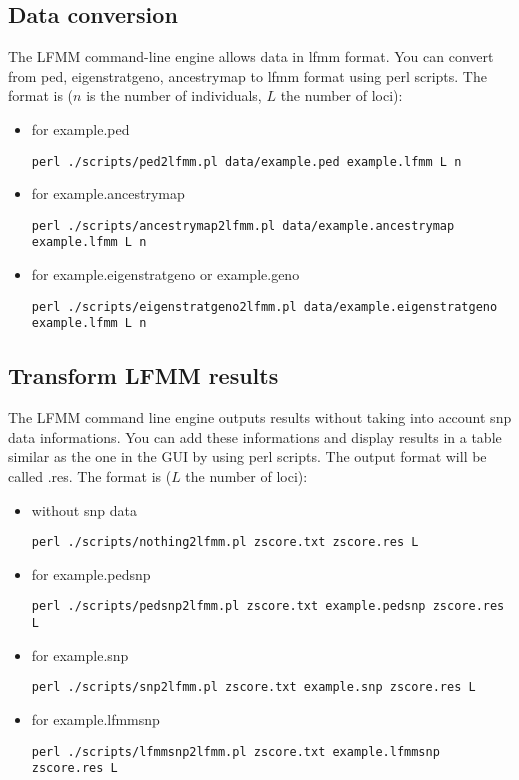 \documentclass[10pt,a4paper]{article}
\begin{document}
\subsection{Data conversion}

The LFMM command-line engine allows data in lfmm format. You can convert from ped, eigenstratgeno,
ancestrymap to lfmm format using perl scripts. The format is ($n$ is the number of individuals,
$L$ the number of loci):
\begin{itemize}
\item for example.ped
\begin{Verbatim}[frame=single]
perl ./scripts/ped2lfmm.pl data/example.ped example.lfmm L n
\end{Verbatim}
\item for example.ancestrymap
\begin{Verbatim}[frame=single]
perl ./scripts/ancestrymap2lfmm.pl data/example.ancestrymap example.lfmm L n
\end{Verbatim}
\item for example.eigenstratgeno or example.geno
\begin{Verbatim}[frame=single]
perl ./scripts/eigenstratgeno2lfmm.pl data/example.eigenstratgeno example.lfmm L n
\end{Verbatim}
\end{itemize}

\subsection{Transform LFMM results}

The LFMM command line engine outputs results without taking into account snp data informations.
You can add these informations and display results in a table similar as the one in the GUI
by using perl scripts. The output format will be called .res.
The format is ($L$ the number of loci):
\begin{itemize}
\item without snp data
\begin{Verbatim}[frame=single]
perl ./scripts/nothing2lfmm.pl zscore.txt zscore.res L
\end{Verbatim}
\item for example.pedsnp
\begin{Verbatim}[frame=single]
perl ./scripts/pedsnp2lfmm.pl zscore.txt example.pedsnp zscore.res L
\end{Verbatim}
\item for example.snp
\begin{Verbatim}[frame=single]
perl ./scripts/snp2lfmm.pl zscore.txt example.snp zscore.res L
\end{Verbatim}
\item for example.lfmmsnp
\begin{Verbatim}[frame=single]
perl ./scripts/lfmmsnp2lfmm.pl zscore.txt example.lfmmsnp zscore.res L
\end{Verbatim}
\end{itemize}
\end{document}
